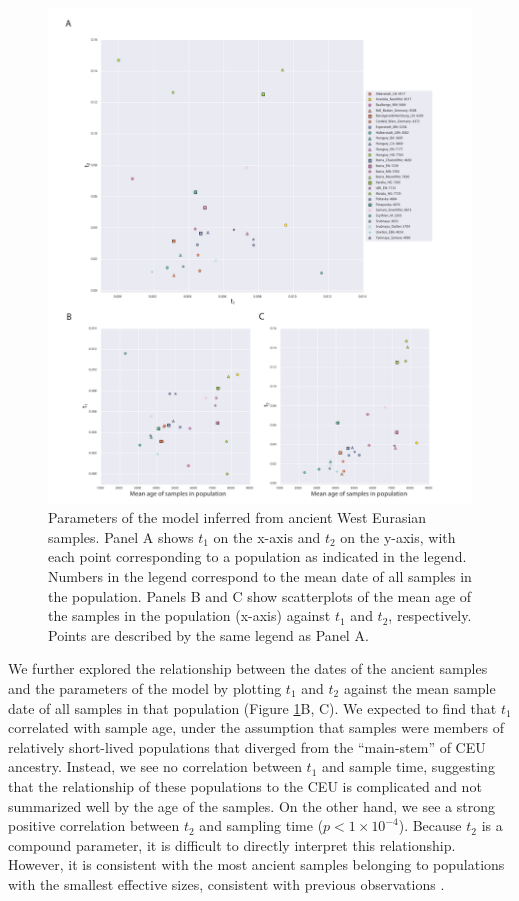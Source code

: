 \documentclass[11pt, oneside]{article}   	%
\begin{document}
\begin{figure}[h] %
   \centering
   \includegraphics[width=.8\textwidth]{parameters_and_age.pdf} 
   \caption{Parameters of the model inferred from ancient West Eurasian samples. Panel A shows $t_1$ on the x-axis and $t_2$ on the y-axis, with each point corresponding to a population as indicated in the legend. Numbers in the legend correspond to the mean date of all samples in the population. Panels B and C show scatterplots of the mean age of the samples in the population (x-axis) against $t_1$ and $t_2$, respectively. Points are described by the same legend as Panel A.}
   \label{pops_together}
\end{figure}

We further explored the relationship between the dates of the ancient samples and the parameters of the model by plotting $t_1$ and $t_2$ against the mean sample date of all samples in that population (Figure \ref{pops_together}B, C). We expected to find that $t_1$ correlated with sample age, under the assumption that samples were members of relatively short-lived populations that diverged from the ``main-stem'' of CEU ancestry. Instead, we see no correlation between $t_1$ and sample time, suggesting that the relationship of these populations to the CEU is complicated and not summarized well by the age of the samples. On the other hand, we see a strong positive correlation between $t_2$ and sampling time ($p < 1\times10^{-4}$). Because $t_2$ is a compound parameter, it is difficult to directly interpret this relationship. However, it is consistent with the most ancient samples belonging to populations with the smallest effective sizes, consistent with previous observations \citep{skoglund2014genomic}. 
\end{document}
